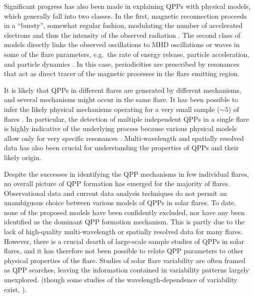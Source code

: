 \documentclass{aastex61}
\begin{document}
Significant progress has also been made in explaining QPPs with physical models, which generally fall into two classes.
In the first, magnetic reconnection proceeds in a ``bursty'', somewhat regular fashion, modulating the number of accelerated electrons and thus the intensity of the observed radiation \citep{kliem2000,ofman2006,murray2009}. 
The second class of models directly links the observed oscillations to MHD oscillations or waves in some of the flare parameters, e.g.\ the rate of energy release, particle acceleration, and particle dynamics \citep{nakariakov2007,pascoe2007}. 
In this case, periodicities are prescribed by resonances that act as direct tracer of the magnetic processes in the flare emitting region.

It is likely that QPPs in different flares are generated by different mechanisms, and several mechanisms might occur in the same flare.
It has been possible to infer the likely physical mechanisms operating for a very small sample ($\sim 5$) of flares \citep{asai2001,melnikov2005,inglis2008}. In particular, the detection of multiple independent QPPs in a single flare is highly indicative of the underlying process because various physical models allow only for very specific resonances \citep{melnikov2005,inglis2009}. 
Multi-wavelength and spatially resolved data has also been crucial for understanding the properties of QPPs and their likely origin. 

Despite the successes in identifying the QPP mechanisms in few individual flares, no overall picture of QPP formation has emerged for the majority of flares. 
Observational data and current data analysis techniques do not permit an unambiguous choice between various models of QPPs in solar flares.
To date, none of the proposed models have been confidently excluded, nor have any been identified as the dominant QPP formation mechanism. 
This is partly due to the lack of high-quality multi-wavelength or spatially resolved data for many flares. 
However, there is a crucial dearth of large-scale sample studies of QPPs in solar flares, and it has therefore not been possible to relate QPP parameters to other physical properties of the flare. 
Studies of solar flare variability are often framed as QPP searches, leaving the information contained in variability patterns largely unexplored. (though some studies of the wavelength-dependence of variability exist, \citep{mcateer2007}).
\end{document}
